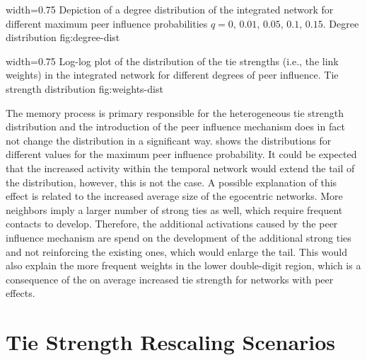       {width=0.75\textwidth}
      {Depiction of a degree distribution of the integrated network for different maximum peer influence probabilities \( q = 0, \, 0.01, \, 0.05, \, 0.1, \, 0.15\).}
      {Degree distribution}
      {fig:degree-dist}


      {width=0.75\textwidth}
      {Log-log plot of the distribution of the tie strengths (i.e., the link weights) in the integrated network for different degrees of peer influence.}
      {Tie strength distribution}
      {fig:weights-dist}

The memory process is primary responsible for the heterogeneous tie strength distribution and the introduction of the peer influence mechanism does in fact not change the distribution in a significant way.
 shows the distributions for different values for the maximum peer influence probability.
It could be expected that the increased activity within the temporal network would extend the tail of the distribution, however, this is not the case.
A possible explanation of this effect is related to the increased average size of the egocentric networks.
More neighbors imply a larger number of strong ties as well, which require frequent contacts to develop.
Therefore, the additional activations caused by the peer influence mechanism are spend on the development of the additional strong ties and not reinforcing the existing ones, which would enlarge the tail.
This would also explain the more frequent weights in the lower double-digit region, which is a consequence of the on average increased tie strength for networks with peer effects.




\section{Tie Strength Rescaling Scenarios}
\label{sec:softmax-rescaling}

